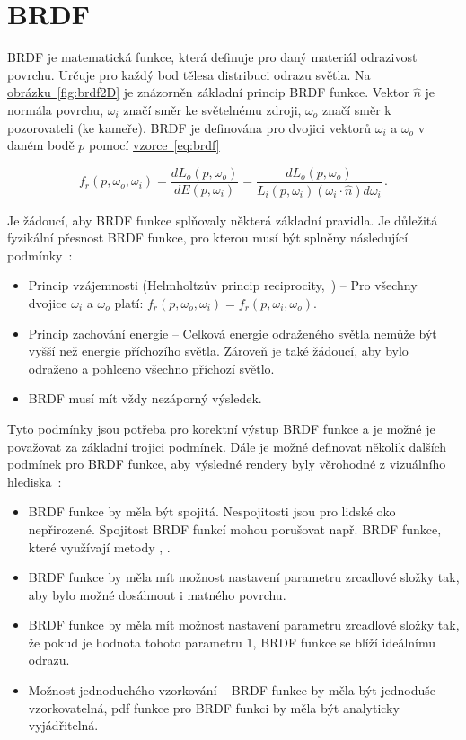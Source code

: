 \documentclass[czech,master]{diploma}
\newcommand{\uvec}[1]{\hat{#1}}
\newcommand{\point}{p}
\newcommand{\brdf}{f_r\left(\point,\omega_{o},\omega_{i}\right)}
\newcommand{\normVec}{\uvec{n}}
\newcommand{\inVec}{\omega_{i}}
\newcommand{\outVec}{\omega_{o}}
\newcommand{\outRadiance}{L_o\left(\point,\outVec\right)}
\newcommand{\inRadiance}{L_i\left(\point,\inVec\right)}
\newcommand{\difirradiance}{dE\left(\point,\inVec\right)}
\newcommand{\inDotNorm}{\left(\inVec\cdot\normVec\right)}
\begin{document}
\clearpage
\chapter{BRDF}
BRDF je matematická funkce, která definuje pro daný materiál odrazivost povrchu. Určuje pro každý bod tělesa distribuci odrazu světla. Na \hyperref[fig:brdf2D]{obrázku~\ref{fig:brdf2D}} je znázorněn základní princip BRDF funkce. Vektor \(\normVec\) je normála povrchu, \(\inVec\) značí směr ke světelnému zdroji, \(\outVec\) značí směr k pozorovateli (ke kameře). BRDF je definována pro dvojici vektorů  \(\inVec\) a \(\outVec\) v daném bodě \(p\) pomocí \hyperref[eq:brdf]{vzorce~\ref{eq:brdf}}

\begin{equation} \label{eq:brdf}
  \brdf = \frac{d\outRadiance}{\difirradiance} = \frac{d\outRadiance}{\inRadiance \inDotNorm d\inVec}\,.
\end{equation}

Je žádoucí, aby BRDF funkce splňovaly některá základní pravidla. Je důležitá fyzikální přesnost BRDF funkce, pro kterou musí být splněny následující podmínky~\cite{PHARR2017313}:

\begin{itemize}
  \item Princip vzájemnosti (Helmholtzův princip reciprocity,~\cite{hapke_2012}) -- Pro všechny dvojice \(\inVec\) a \(\outVec\) platí: \(\brdf = f_r\left(p,\inVec,\outVec\right)\).
  \item Princip zachování energie -- Celková energie odraženého světla nemůže být vyšší než energie příchozího světla. Zároveň je také žádoucí, aby bylo odraženo a pohlceno všechno příchozí světlo.
  \item BRDF musí mít vždy nezáporný výsledek.
\end{itemize}
Tyto podmínky jsou potřeba pro korektní výstup BRDF funkce a je možné je považovat za základní trojici podmínek. Dále je možné definovat několik dalších podmínek pro BRDF funkce, aby výsledné rendery byly věrohodné z vizuálního hlediska~\cite{EnergyConservingRadziszewski}:

\begin{itemize}
  \item BRDF funkce by měla být spojitá. Nespojitosti jsou pro lidské oko nepřirozené. Spojitost BRDF funkcí mohou porušovat např. BRDF funkce, které využívají metody , .
  \item BRDF funkce by měla mít možnost nastavení parametru zrcadlové složky tak, aby bylo možné dosáhnout i matného povrchu.
  \item BRDF funkce by měla mít možnost nastavení parametru zrcadlové složky tak, že pokud je hodnota tohoto parametru \(1\), BRDF funkce se blíží ideálnímu odrazu.
  \item Možnost jednoduchého vzorkování -- BRDF funkce by měla být jednoduše vzorkovatelná, pdf funkce pro BRDF funkci by měla být analyticky vyjádřitelná.
\end{itemize}
\end{document}
